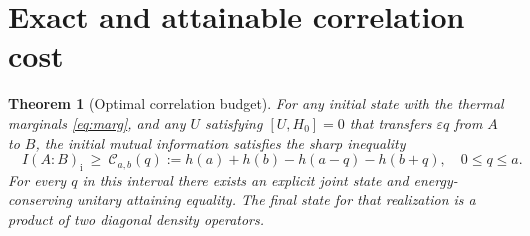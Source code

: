 \documentclass[11pt,a4paper]{article}
\newtheorem{theorem}{Theorem}
\newcommand{\eps}{\varepsilon}
\begin{document}
\section{Exact and attainable correlation cost}
\begin{theorem}[Optimal correlation budget]\label{th:main}
For any initial state with the thermal marginals \eqref{eq:marg}, and any $U$ satisfying $[U,H_0]=0$ that transfers $\eps q$ from $A$ to $B$, the initial mutual information satisfies the \emph{sharp} inequality
\begin{equation}\label{eq:cost}
\boxed{\quad I(A\!:\!B)_{\mathrm i}\ \ge\ \mathcal C_{a,b}(q)
:=h(a)+h(b)-h(a-q)-h(b+q),\quad 0\le q\le a.\quad}
\end{equation}
For every $q$ in this interval there exists an explicit joint state and energy-conserving unitary attaining equality. The final state for that realization is a product of two diagonal density operators.
\end{theorem}
\end{document}
